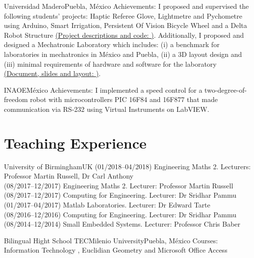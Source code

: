 \documentclass[10pt,a4paper,roman]{moderncv}
\begin{document}
{Universidad Madero}{Puebla, M\'exico}{}
{Achievements:
I proposed and supervised the following students' projects: Haptic Referee Glove,
 Lightmetre and Pychometre using Arduino, Smart Irrigation, Persistent Of Vision Bicycle Wheel
 and a Delta Robot Structure 
\href{https://sites.google.com/site/perezxochicaleprojects/studentprojects}{(Project descriptions and code: \faExternalLink)}.
Additionally, I proposed and designed a Mechatronic Laboratory which includes: 
(i) a benchmark for laboratories in mechatronics in M\'exico and Puebla, 
(ii) a 3D layout design and 
(iii) minimal requirements of hardware and software for the laboratory
 \href{https://sites.google.com/site/perezxochicaleprojects/mechatronicslaboratorydesign}{(Document, slides and layout: \faExternalLink)}.
}

{INAOE}{M\'exico}{}
{Achievements:
I implemented a speed control for a two-degree-of-freedom robot with microcontrollers
PIC 16F84 and 16F877 that made communication via RS-232 using Virtual Instruments on LabVIEW.}



\section{Teaching Experience}

{University of Birmingham}{UK}{}
{
(01/2018--04/2018) Engineering Maths 2. Lecturers: Professor Martin Russell, Dr Carl Anthony \\
(08/2017--12/2017) Engineering Maths 2. Lecturer: Professor Martin Russell \\
(08/2017--12/2017) Computing for Engineering. Lecturer: Dr Sridhar Pammu \\
(01/2017--04/2017) Matlab Laboratories. Lecturer: Dr Edward Tarte \\
(08/2016--12/2016) Computing for Engineering. Lecturer: Dr Sridhar Pammu \\
(08/2014--12/2014) Small Embedded Systems. Lecturer: Professor Chris Baber
}

{Bilingual Hight School TECMilenio University}{Puebla, M\'exico}{}
{Courses:
Information Technology \href{https://sites.google.com/site/perezxochicale/teaching/iit}{\faExternalLink},
Euclidian Geometry  \href{https://sites.google.com/site/perezxochicale/teaching/euclidean-geometry}{\faExternalLink}
and
Microsoft Office Access \href{https://sites.google.com/site/perezxochicale/teaching/moa}{\faExternalLink}
}
\end{document}
